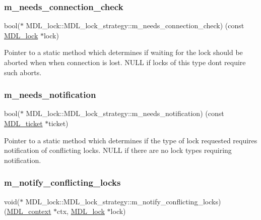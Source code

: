 \subsubsection{\texorpdfstring{m\+\_\+needs\+\_\+connection\+\_\+check}{m\_needs\_connection\_check}}
{\footnotesize\ttfamily bool($\ast$ M\+D\+L\+\_\+lock\+::\+M\+D\+L\+\_\+lock\+\_\+strategy\+::m\+\_\+needs\+\_\+connection\+\_\+check) (const \mbox{\hyperlink{classMDL__lock}{M\+D\+L\+\_\+lock}} $\ast$lock)}

Pointer to a static method which determines if waiting for the lock should be aborted when when connection is lost. N\+U\+LL if locks of this type don\textquotesingle{}t require such aborts. \mbox{\label{structMDL__lock_1_1MDL__lock__strategy_ada7f78a5cf59cf308e33bfffbb54be26}} 
\subsubsection{\texorpdfstring{m\+\_\+needs\+\_\+notification}{m\_needs\_notification}}
{\footnotesize\ttfamily bool($\ast$ M\+D\+L\+\_\+lock\+::\+M\+D\+L\+\_\+lock\+\_\+strategy\+::m\+\_\+needs\+\_\+notification) (const \mbox{\hyperlink{classMDL__ticket}{M\+D\+L\+\_\+ticket}} $\ast$ticket)}

Pointer to a static method which determines if the type of lock requested requires notification of conflicting locks. N\+U\+LL if there are no lock types requiring notification. \mbox{\label{structMDL__lock_1_1MDL__lock__strategy_a1ac597d3a597367d03f5901c8001cb51}} 
\subsubsection{\texorpdfstring{m\+\_\+notify\+\_\+conflicting\+\_\+locks}{m\_notify\_conflicting\_locks}}
{\footnotesize\ttfamily void($\ast$ M\+D\+L\+\_\+lock\+::\+M\+D\+L\+\_\+lock\+\_\+strategy\+::m\+\_\+notify\+\_\+conflicting\+\_\+locks) (\mbox{\hyperlink{classMDL__context}{M\+D\+L\+\_\+context}} $\ast$ctx, \mbox{\hyperlink{classMDL__lock}{M\+D\+L\+\_\+lock}} $\ast$lock)}

